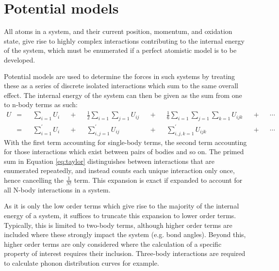 \section{Potential models}
All atoms in a system, and their current position, momentum, and oxidation state, give rise to highly complex interactions contributing to the internal energy of the system, which must be enumerated if a perfect atomistic model is to be developed.

Potential models are used to determine the forces in such systems by treating these as a series of discrete isolated interactions which sum to the same overall effect. 
The internal energy of the system can then be given as the sum from one to n-body terms as such:\cite{Gale2003}
\begin{align}
U &=& &\sum_{i = 1} U_i&         &+& &\frac{1}{2}\sum_{i = 1} \sum_{j = 1} U_{ij}&  &+& &\frac{1}{6}\sum_{i = 1} \sum_{j = 1} \sum_{k = 1} U_{ijk}& &+& &\cdots\\
&=& &\sum_{i = 1}^\prime U_i&  &+& &\sum_{i,j = 1}^\prime U_{ij}&                 &+& &\sum_{i,j,k = 1}^\prime U_{ijk}&                           &+& &\cdots
\label{eq:taylor}
\end{align}
With the first term accounting for single-body terms, the second term accounting for those interactions which exist between pairs of bodies and so on.
The primed sum in Equation \ref{eq:taylor} distinguishes between interactions that are enumerated repeatedly, and instead counts each unique interaction only once, hence cancelling the $\frac{1}{N!}$ term.
This expansion is exact if expanded to account for all N-body interactions in a system.

As it is only the low order terms which give rise to the majority of the internal energy of a system, it suffices to truncate this expansion to lower order terms.
Typically, this is limited to two-body terms, although higher order terms are included where these strongly impact the system (e.g. bond angles).
Beyond this, higher order terms are only considered where the calculation of a specific property of interest requires their inclusion.
Three-body interactions are required to calculate phonon distribution curves for example.

